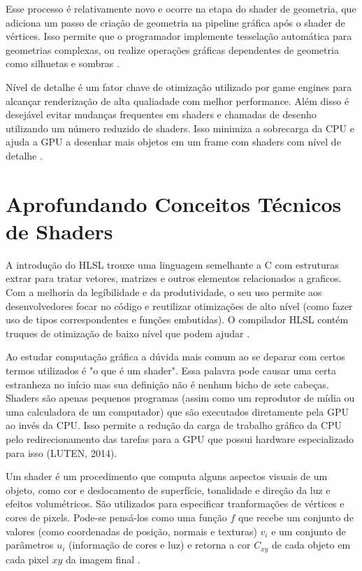 Esse processo é relativamente novo e ocorre na etapa do shader de geometria, que adiciona um passo de criação de geometria na pipeline gráfica após o shader de vértices. Isso permite que o programador implemente tesselação automática para geometrias complexas, ou realize operações gráficas dependentes de geometria como silhuetas e sombras \cite{bailey2007}.

Nível de detalhe é um fator chave de otimização utilizado por game engines para alcançar renderização de alta qualiadade com melhor performance. Além disso é desejável evitar mudanças frequentes em shaders e chamadas de desenho utilizando um número reduzido de shaders. Isso minimiza a sobrecarga da CPU e ajuda a GPU a desenhar mais objetos em um frame com shaders com nível de detalhe \cite{yong2015rapid}.

\section{Aprofundando Conceitos Técnicos de Shaders}
\label{sec:aprofundando-conceitos-tecnicos-shaders}

A introdução do HLSL trouxe uma linguagem semelhante a C com estruturas extrar para tratar vetores, matrizes e outros elementos relacionados a graficos. Com a melhoria da legíbilidade e da produtividade, o seu uso permite aos desenvolvedores focar no código e reutilizar otimizações de alto nível (como fazer uso de tipos correspondentes e funções embutidas). O compilador HLSL contém truques de otimização de baixo nível que podem ajudar \cite{riguer2002performance}.

Ao estudar computação gráfica a dúvida mais comum ao se deparar com certos termos utilizados é "o que é um shader". Essa palavra pode causar uma certa estranheza no início mas sua definição não é nenhum bicho de sete cabeças. Shaders são apenas pequenos programas (assim como um reprodutor de mídia ou uma calculadora de um computador) que são executados diretamente pela \acrshort{GPU} ao invés da \acrshort{CPU}. Isso permite a redução da carga de trabalho gráfico da \acrshort{CPU} pelo redirecionamento das tarefas para a \acrshort{GPU} que possui hardware especializado para isso (LUTEN, 2014)\nocite{openGLBook}.

Um shader é um procedimento que computa alguns aspectos visuais de um objeto, como cor e deslocamento de superfície, tonalidade e direção da luz e efeitos volumétricos. São utilizados para especificar tranformações de vértices e cores de pixels. Pode-se pensá-los como uma função $ f $ que recebe um conjunto de valores (como coordenadas de posição, normais e texturas) $ v_i $ e um conjunto de parâmetros $ u_i $ (informação de cores e luz) e retorna a cor $ C_{xy} $ de cada objeto em cada pixel $ xy $ da imagem final \cite{fabio2005user}. 

